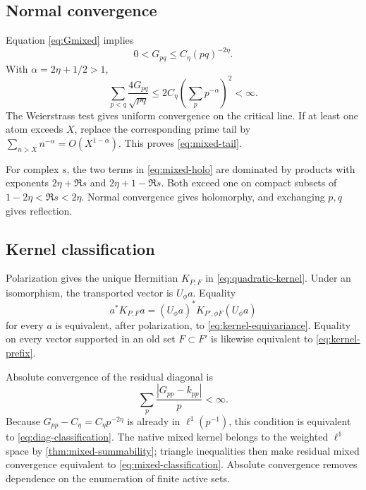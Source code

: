 \subsection{Normal convergence}

Equation \eqref{eq:Gmixed} implies
\begin{equation}
 0<G_{pq}\le C_\eta(pq)^{-2\eta}.
\end{equation}
With $\alpha=2\eta+1/2>1$,
\begin{equation}
 \sum_{p<q}\frac{4G_{pq}}{\sqrt{pq}}
 \le2C_\eta\left(\sum_pp^{-\alpha}\right)^2<\infty.
\end{equation}
The Weierstrass test gives uniform convergence on the critical line.  If at
least one atom exceeds $X$, replace the corresponding prime tail by
$\sum_{n>X}n^{-\alpha}=O(X^{1-\alpha})$.  This proves
\eqref{eq:mixed-tail}.

For complex $s$, the two terms in \eqref{eq:mixed-holo} are dominated by
products with exponents $2\eta+\Re s$ and
$2\eta+1-\Re s$.  Both exceed one on compact subsets of
$1-2\eta<\Re s<2\eta$.  Normal convergence gives holomorphy, and exchanging
$p,q$ gives reflection.

\subsection{Kernel classification}

Polarization gives the unique Hermitian $K_{P,F}$ in
\eqref{eq:quadratic-kernel}.  Under an isomorphism, the transported vector is
$U_\phi a$.  Equality
\begin{equation}
 a^*K_{P,F}a=(U_\phi a)^*K_{P',\phi F}(U_\phi a)
\end{equation}
for every $a$ is equivalent, after polarization, to
\eqref{eq:kernel-equivariance}.  Equality on every vector supported in an
old set $F\subset F'$ is likewise equivalent to
\eqref{eq:kernel-prefix}.

Absolute convergence of the residual diagonal is
\begin{equation}
 \sum_p\frac{|G_{pp}-k_{pp}|}{p}<\infty.
\end{equation}
Because $G_{pp}-C_\eta=C_\eta p^{-2\eta}$ is already in
$\ell^1(p^{-1})$, this condition is equivalent to
\eqref{eq:diag-classification}.  The native mixed kernel belongs to the
weighted $\ell^1$ space by \cref{thm:mixed-summability}; triangle inequalities
then make residual mixed convergence equivalent to
\eqref{eq:mixed-classification}.  Absolute convergence removes dependence on
the enumeration of finite active sets.

